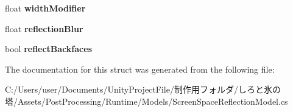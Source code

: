 \begin{DoxyCompactItemize}
float {\bfseries width\+Modifier}
\item 
\mbox{\label{struct_unity_engine_1_1_post_processing_1_1_screen_space_reflection_model_1_1_reflection_settings_a5d0f0e42f7a47b7054f09add92c5a1d4}} 
float {\bfseries reflection\+Blur}
\item 
\mbox{\label{struct_unity_engine_1_1_post_processing_1_1_screen_space_reflection_model_1_1_reflection_settings_aea5f2791fe328b408dca33c78e741dd4}} 
bool {\bfseries reflect\+Backfaces}
\end{DoxyCompactItemize}


The documentation for this struct was generated from the following file\+:\begin{DoxyCompactItemize}
\item 
C\+:/\+Users/user/\+Documents/\+Unity\+Project\+File/制作用フォルダ/しろと氷の塔/\+Assets/\+Post\+Processing/\+Runtime/\+Models/Screen\+Space\+Reflection\+Model.\+cs\end{DoxyCompactItemize}
